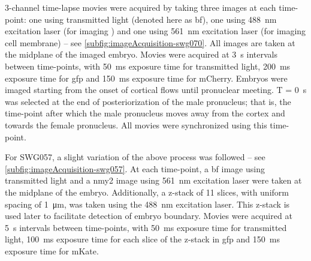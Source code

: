 3-channel time-lapse movies were acquired by taking three images at each time-point: one using transmitted light (denoted here as \ac{bf}), one using \SI{488}{\nano\meter} excitation laser (for imaging ) and one using \SI{561}{\nano\meter} excitation laser (for imaging cell membrane) -- see \autoref{subfig:imageAcquisition-swg070}. All images are taken at the midplane of the imaged embryo. Movies were acquired at \SI{3}{\second} intervals between time-points, with \SI{50}{\milli\second} exposure time for transmitted light, \SI{200}{\milli\second} exposure time for \ac{gfp} and \SI{150}{\milli\second} exposure time for mCherry. Embryos were imaged starting from the onset of cortical flows until pronuclear meeting. T = \SI{0}{\second} was selected at the end of posteriorization of the male pronucleus; that is, the time-point after which the male pronucleus moves away from the cortex and towards the female pronucleus. All movies were synchronized using this time-point.

For SWG057, a slight variation of the above process was followed  -- see \autoref{subfig:imageAcquisition-swg057}. At each time-point, a \ac{bf} image using transmitted light and a \ac{nmy2} image using \SI{561}{\nano\meter} excitation laser were taken at the midplane of the embryo. Additionally, a z-stack of \num{11} slices, with uniform spacing of \SI{1}{\micro\meter}, was taken using the \SI{488}{\nano\meter} excitation laser. This z-stack is used later to facilitate detection of embryo boundary. Movies were acquired at \SI{5}{\second} intervals between time-points, with \SI{50}{\milli\second} exposure time for transmitted light, \SI{100}{\milli\second} exposure time for each slice of the z-stack in \ac{gfp} and \SI{150}{\milli\second} exposure time for mKate.

